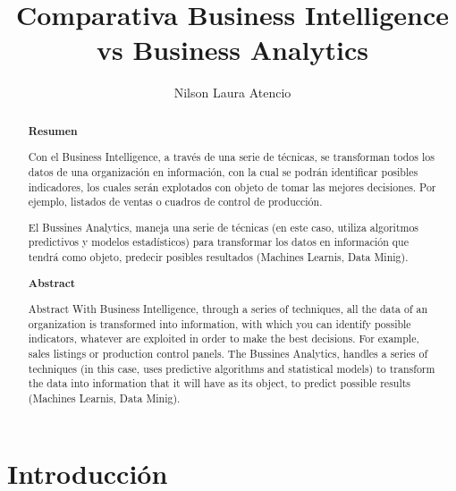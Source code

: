 \documentclass[%
 reprint,
 amsmath,amssymb,
 aps,
]{revtex4-1}
\begin{document}
\title{Comparativa Business Intelligence vs Business Analytics}
\author{Nilson Laura Atencio}
%

\begin{abstract}
\begin{center}
\textbf{Resumen}
\end{center}

Con el Business Intelligence, a través de una serie de técnicas, se transforman todos los datos de una organización en información, con la cual se podrán identificar posibles indicadores, los cuales serán explotados con objeto de tomar las mejores decisiones. Por ejemplo, listados de ventas o cuadros de control de producción.

El Bussines Analytics, maneja una serie de técnicas (en este caso, utiliza algoritmos predictivos y modelos estadísticos) para transformar los datos en información que tendrá como objeto, predecir posibles resultados (Machines Learnis, Data Minig).



\begin{center}
\textbf{Abstract}
\end{center}
Abstract
With Business Intelligence, through a series of techniques, all the data of an organization is transformed into information, with which you can identify possible indicators, whatever are exploited in order to make the best decisions. For example, sales listings or production control panels. The Bussines Analytics, handles a series of techniques (in this case, uses predictive algorithms and statistical models) to transform the data into information that it will have as its object, to predict possible results (Machines Learnis, Data Minig).


\end{abstract}



\maketitle


\section {Introducción}
\end{document}
